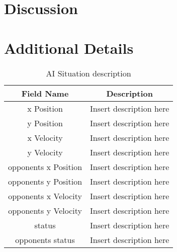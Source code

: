 \documentclass{article}
\begin{document}
\section{Discussion}

\section{Additional Details}

\begin{table}[h]
	\centering
	\caption{AI Situation description}
	\begin{tabular}{| c | c |}
		\hline
		Field Name & Description \\
		\hline
		x Position        & Insert description here 	\\
		\hline
		y Position        & Insert description here 	\\
		\hline
		x Velocity        & Insert description here 	\\
		\hline
		y Velocity        & Insert description here 	\\
		\hline
		opponents x Position        & Insert description here 	\\
		\hline
		opponents y Position        & Insert description here 	\\
		\hline
		opponents x Velocity        & Insert description here 	\\
		\hline
		opponents y Velocity        & Insert description here 	\\
		\hline
		status        & Insert description here 	\\
		\hline
		opponents status        & Insert description here 	\\
		\hline
	\end{tabular}
\end{table}
\end{document}
